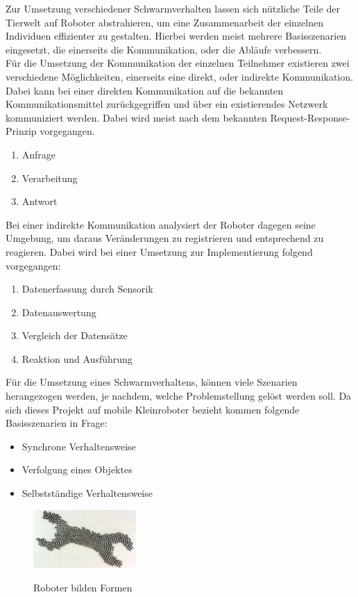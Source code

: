 Zur Umsetzung verschiedener Schwarmverhalten lassen sich nützliche Teile der Tierwelt auf Roboter abstrahieren, um eine Zusammenarbeit der einzelnen Individuen effizienter zu gestalten. Hierbei werden meist mehrere Basisszenarien eingesetzt, die einerseits die Kommunikation, oder die Abläufe verbessern.\\
Für die Umsetzung der Kommunikation der einzelnen Teilnehmer existieren zwei verschiedene Möglichkeiten, einerseits eine direkt, oder indirekte Kommunikation. Dabei kann bei einer direkten Kommunikation auf die bekannten Kommunikationsmittel zurückgegriffen und über ein existierendes Netzwerk kommuniziert werden. Dabei wird meist nach dem bekannten Request-Response-Prinzip vorgegangen.
\begin{enumerate}
	\item Anfrage
	\item Verarbeitung
	\item Antwort
\end{enumerate}
Bei einer indirekte Kommunikation analysiert der Roboter dagegen seine Umgebung, um daraus Veränderungen zu registrieren und entsprechend zu reagieren. Dabei wird bei einer Umsetzung zur Implementierung folgend vorgegangen:
\begin{enumerate}
	\item Datenerfassung durch Sensorik
	\item Datenauswertung
	\item Vergleich der Datensätze
	\item Reaktion und Ausführung
\end{enumerate}
Für die Umsetzung eines Schwarmverhaltens, können viele Szenarien herangezogen werden, je nachdem, welche Problemstellung gelöst werden soll. Da sich dieses Projekt auf mobile Kleinroboter bezieht kommen folgende Basisszenarien in Frage:
\begin{itemize}
	\item Synchrone Verhaltensweise
	\item Verfolgung eines Objektes
	\item Selbstständige Verhaltensweise
\end{itemize}

\begin{figure}
	\begin{center}
		\vspace{-1cm}
		\includegraphics[width=0.35\textwidth]{images/technische_grundlagen/roboterform.jpg}
	\end{center}
	\caption{Roboter bilden Formen}
	\cite{FrankfurterAllgemeineZeitungGmbH.Schwarmverhalten:Roboter}
	\label{fig:roboterFormen}
\end{figure}

